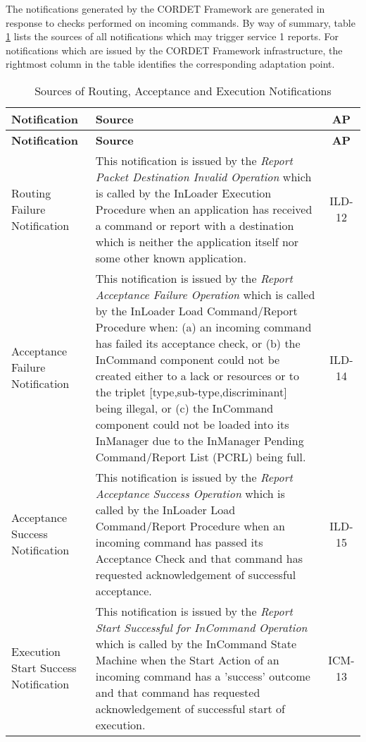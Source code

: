 \documentclass{pnp_article}
\begin{document}
The notifications generated by the CORDET Framework are generated in response to checks performed on incoming commands. By way of summary, table \ref{tab:sourcesNotif} lists the sources of all notifications which may trigger service 1 reports. For notifications which are issued by the CORDET Framework infrastructure, the rightmost column in the table identifies the corresponding adaptation point.



\begin{longtable}{|>{\raggedright\arraybackslash}p{2.1cm}|>{\raggedright\arraybackslash}p{9.8cm}|c|}
\caption{Sources of Routing, Acceptance and Execution Notifications}\label{tab:sourcesNotif} \\
\hline
\rowcolor{light-gray}
\textbf{Notification} & \textbf{Source} & \textbf{AP} \\
\hline\hline
\endfirsthead
\rowcolor{light-gray}
\textbf{Notification} & \textbf{Source} & \textbf{AP} \\
\hline\hline
\endhead
Routing Failure Notification & This notification is issued by the \textit{Report Packet Destination Invalid Operation} which is called by the InLoader Execution Procedure when an application has received a command or report with a destination which is neither the application itself nor some other known application. & ILD-12 \\
\hline
Acceptance Failure Notification & This notification is issued by the \textit{Report Acceptance Failure Operation} which is called by the InLoader Load Command/Report Procedure when: (a) an incoming command has failed its acceptance check, or (b) the InCommand component could not be created either to a lack or resources or to the triplet [type,sub-type,discriminant] being illegal, or (c) the InCommand component could not be loaded into its InManager due to the InManager Pending Command/Report List (PCRL) being full. & ILD-14 \\
\hline
Acceptance Success Notification & This notification is issued by the \textit{Report Acceptance Success Operation} which is called by the InLoader Load Command/Report Procedure when an incoming command has passed its Acceptance Check and that command has requested acknowledgement of successful acceptance. & ILD-15 \\
\hline
Execution Start Success Notification &  This notification is issued by the \textit{Report Start Successful for InCommand Operation} which is called by the InCommand State Machine when the Start Action of an incoming command has a 'success' outcome and that command has requested acknowledgement of successful start of execution. & ICM-13 \\

\end{longtable}
\end{document}

